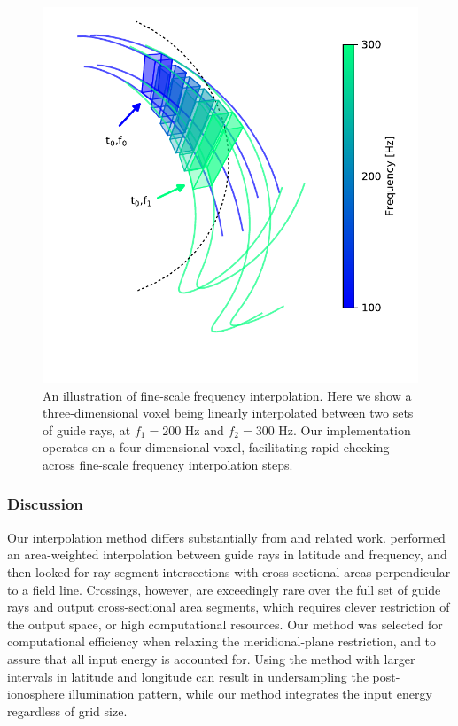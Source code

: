 \begin{figure}[h!]
\begin{center}
\includegraphics{figures/delaunay_2.pdf}
\caption[Fine-scale frequency interpolation]{An illustration of fine-scale frequency interpolation. Here we show a three-dimensional voxel being linearly interpolated between two sets of guide rays, at $f_1=200$ Hz and $f_2=300$ Hz. Our implementation operates on a four-dimensional voxel, facilitating rapid checking across fine-scale frequency interpolation steps.}
\label{fig:delaunay_2}
\end{center}
\end{figure}

\subsubsection{Discussion}
Our interpolation method differs substantially from \cite{Bortnik2005} and related work. \citeauthor{Bortnik2005} performed an area-weighted interpolation between guide rays in latitude and frequency, and then looked for ray-segment intersections with cross-sectional areas perpendicular to a field line. Crossings, however, are exceedingly rare over the full set of guide rays and output cross-sectional area segments, which requires clever restriction of the output space, or high computational resources. Our method was selected for computational efficiency when relaxing the meridional-plane restriction, and to assure that all input energy is accounted for. Using the \cite{Bortnik2005} method with larger intervals in latitude and longitude can result in undersampling the post-ionosphere illumination pattern, while our method integrates the input energy regardless of grid size.

